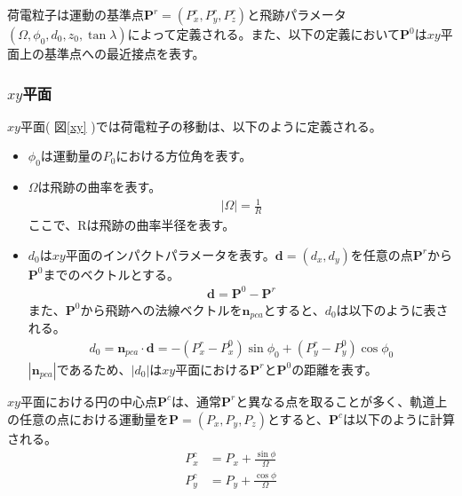 荷電粒子は運動の基準点$\mathbf{P}^r = \left( P_x^r, P_y^r, P_z^r \right)$と飛跡パラメータ$\left( \Omega, {\phi}_0, d_0, z_0, \tan \lambda \right)$によって定義される。また、以下の定義において$\mathbf{P}^0$は$xy$平面上の基準点への最近接点を表す。
\subsubsection{$xy$平面}
$xy$平面( 図\ref{xy} )では荷電粒子の移動は、以下のように定義される。\cite{lcio}
\begin{itemize}
\item ${\phi}_0$は運動量の$P_0$における方位角を表す。\\
\item $\Omega$は飛跡の曲率を表す。\\
\begin{align}
|\Omega | = \frac{1}{R}
\end{align}
ここで、Rは飛跡の曲率半径を表す。\\
\item $d_0$は$xy$平面のインパクトパラメータを表す。$\mathbf{d} = (d_x, d_y)$を任意の点$\mathbf{P}^r$から$\mathbf{P}^0$までのベクトルとする。\\
\begin{align}
\mathbf{d} = \mathbf{P}^0 - \mathbf{P}^r
\end{align}
また、$\mathbf{P}^0$から飛跡への法線ベクトルを$\mathbf{n}_{pca}$とすると、$d_0$は以下のように表される。
\begin{align}
d_0 = \mathbf{n}_{pca} \cdot \mathbf{d} = - ( P_x^r - P_x^0 ) \sin {\phi}_0 +  ( P_y^r - P_y^0 ) \cos {\phi}_0
\end{align}
$|\mathbf{n}_{pca}|$であるため、$|d_0|$は$xy$平面における$\mathbf{P}^r$と$\mathbf{P}^0$の距離を表す。
\end{itemize}
$xy$平面における円の中心点$\mathbf{P}^c$は、通常$\mathbf{P}^r$と異なる点を取ることが多く、軌道上の任意の点における運動量を$\mathbf{P} = \left( P_x, P_y, P_z \right)$とすると、$\mathbf{P}^c$は以下のように計算される。
\begin{align}
P_x^c &= P_x + \frac{\sin \phi}{\Omega}\\
P_y^c &= P_y + \frac{\cos \phi}{\Omega}\\
\end{align}
